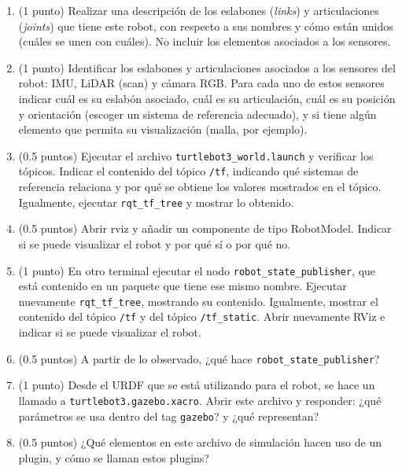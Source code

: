 \documentclass[a4paper,11pt]{robotlabs}
\begin{document}
\begin{enumerate}
\item (1 punto) Realizar una descripción de los eslabones (\textit{links}) y
  articulaciones (\textit{joints}) que tiene este robot, con respecto a sus
  nombres y cómo están unidos (cuáles se unen con cuáles). No incluir los
  elementos asociados a los sensores.
  
\item (1 punto) Identificar los eslabones y articulaciones asociados a los
  sensores del robot: IMU, LiDAR (scan) y cámara RGB. Para cada uno de estos
  sensores indicar cuál es su eslabón asociado, cuál es su articulación, cuál
  es su posición y orientación (escoger un sistema de referencia adecuado), y
  si tiene algún elemento que permita su visualización (malla, por ejemplo).

\item (0.5 puntos) Ejecutar el archivo \texttt{turtlebot3\_world.launch} y verificar
  los tópicos. Indicar el contenido del tópico \texttt{/tf}, indicando qué
  sistemas de referencia relaciona y por qué se obtiene los valores mostrados
  en el tópico. Igualmente, ejecutar \texttt{rqt\_tf\_tree} y mostrar lo
  obtenido.

\item (0.5 puntos) Abrir rviz y añadir un componente de tipo
  RobotModel. Indicar si se puede visualizar el robot y por qué sí o por qué
  no.

\item (1 punto) En otro terminal ejecutar el nodo
  \texttt{robot\_state\_publisher}, que está contenido en un paquete que tiene
  ese mismo nombre. Ejecutar nuevamente \texttt{rqt\_tf\_tree}, mostrando su
  contenido. Igualmente, mostrar el contenido del tópico \texttt{/tf} y del
  tópico \texttt{/tf\_static}. Abrir nuevamente RViz e indicar si se puede
  visualizar el robot.

\item (0.5 puntos) A partir de lo observado, ¿qué hace
  \texttt{robot\_state\_publisher}?
  
\item (1 punto) Desde el URDF que se está utilizando para el robot, se hace un
  llamado a \texttt{turtlebot3.gazebo.xacro}. Abrir este archivo y responder:
  ¿qué parámetros se usa dentro del tag \texttt{gazebo}? y ¿qué representan?

\item (0.5 puntos) ¿Qué elementos en este archivo de simulación hacen uso de un
  plugin, y cómo se llaman estos plugins?
  

\end{enumerate}
\end{document}
